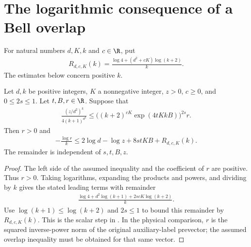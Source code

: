 \section{The logarithmic consequence of a Bell overlap}

\begin{definition}
    \label{def:bell_overlap_remainder}
    \leanok
    For natural numbers $d,K,k$ and $c\in\R$, put
    \begin{align*}
        R_{d,c,K}(k)
        =\frac{\log4+(d^2+cK)\log(k+2)}{k}.
    \end{align*}
    The estimates below concern positive $k$.
\end{definition}

\begin{theorem}
    \label{thm:bell_overlap_log_bound}
    \leanok
    Let $d,k$ be positive integers, $K$ a nonnegative integer, $z>0$,
    $c\ge0$, and $0\le2s\le1$. Let $t,B,r\in\R$. Suppose that
    \begin{align*}
        \frac{(z/d^2)^k}{4(k+1)^{d^2}}
        \le\bigl((k+2)^{cK}\exp(4tKkB)\bigr)^{2s}r.
    \end{align*}
    Then $r>0$ and
    \begin{align*}
        -\frac{\log r}{k}
        \le2\log d-\log z+8stKB+R_{d,c,K}(k).
    \end{align*}
    The remainder is independent of $s,t,B,z$.
\end{theorem}
\begin{proof}
    \leanok
    The left side of the assumed inequality and the coefficient of $r$
    are positive. Thus $r>0$. Taking logarithms, expanding the products
    and powers, and dividing by $k$ gives the stated leading terms with
    remainder
    \begin{align*}
        \frac{\log4+d^2\log(k+1)+2scK\log(k+2)}{k}.
    \end{align*}
    Use $\log(k+1)\le\log(k+2)$ and $2s\le1$ to bound this remainder
    by $R_{d,c,K}(k)$. This is the scalar step in
    \cite[\texttt{07-comparators.tex}, lines 153--163 and 332--381]{OpenAI2026AreaLaw}.
    In the physical comparison, $r$ is the squared inverse-power norm
    of the original auxiliary-label prevector; the assumed overlap
    inequality must be obtained for that same vector.
\end{proof}

